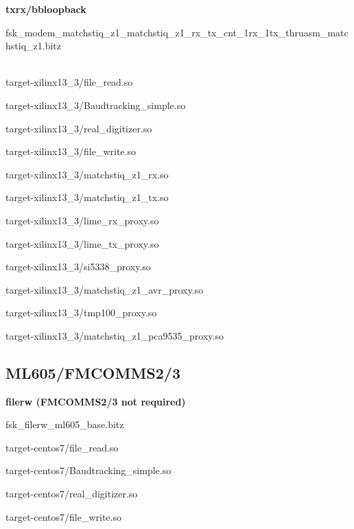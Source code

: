 	\noindent\textbf{txrx/bbloopback}
	\begin{itemize}
	\item fsk\_modem\_matchstiq\_z1\_matchstiq\_z1\_rx\_tx\_cnt\_1rx\_1tx\_thruasm\_matchstiq\_z1.bitz \\ \\
	\begin{minipage}[t]{.5\textwidth}
	\item target-xilinx13\_3/file\_read.so
	\item target-xilinx13\_3/Baudtracking\_simple.so
	\item target-xilinx13\_3/real\_digitizer.so
	\item target-xilinx13\_3/file\_write.so
	\item target-xilinx13\_3/matchstiq\_z1\_rx.so
	\item target-xilinx13\_3/matchstiq\_z1\_tx.so
	\end{minipage}
	\begin{minipage}[t]{.5\textwidth}
	\item target-xilinx13\_3/lime\_rx\_proxy.so
	\item target-xilinx13\_3/lime\_tx\_proxy.so
	\item target-xilinx13\_3/si5338\_proxy.so
	\item target-xilinx13\_3/matchstiq\_z1\_avr\_proxy.so
	\item target-xilinx13\_3/tmp100\_proxy.so
	\item target-xilinx13\_3/matchstiq\_z1\_pca9535\_proxy.so
	\end{minipage}
	\end{itemize}
\pagebreak



\subsection{ML605/FMCOMMS2/3}
	\noindent\textbf{filerw (FMCOMMS2/3 not required)}
	\begin{itemize}
	\begin{minipage}[t]{.5\textwidth}
	\item fsk\_filerw\_ml605\_base.bitz
	\item target-centos7/file\_read.so
	\item target-centos7/Baudtracking\_simple.so
	\end{minipage}
	\begin{minipage}[t]{.5\textwidth}
	\item target-centos7/real\_digitizer.so
	\item target-centos7/file\_write.so
	\end{minipage}
	\end{itemize}

